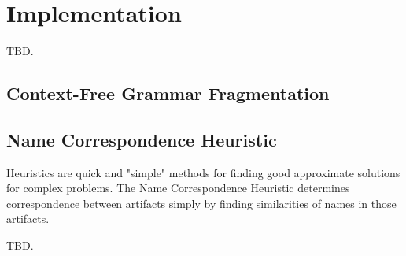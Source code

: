 \chapter{Implementation}
TBD.

\section{Context-Free Grammar Fragmentation}


\section{Name Correspondence Heuristic}


Heuristics are quick and "simple" methods for finding good approximate solutions for complex problems.
The Name Correspondence Heuristic determines correspondence between artifacts simply by finding similarities of names in those artifacts. 

TBD.